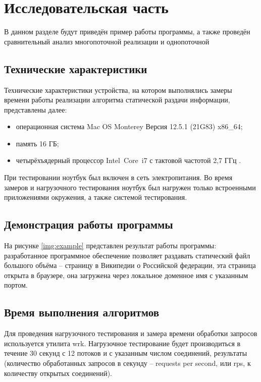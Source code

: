 \chapter{Исследовательская часть}

В данном разделе будут приведён пример работы программы, а также проведён сравнительный анализ многопоточной реализации и однопоточной

\section{Технические характеристики}

Технические характеристики устройства, на котором выполнялись замеры времени работы реализации алгоритма статической раздачи информации, представлены далее:

\begin{itemize}
	\item операционная система Mac OS Monterey Версия 12.5.1 (21G83) \cite{macos} x86\_64;
	\item память 16 ГБ;
	\item четырёхъядерный процессор Intel Core i7 с тактовой частотой 2,7 ГГц \cite{intel}.
\end{itemize}

При тестировании ноутбук был включен в сеть электропитания. Во время замеров и нагрузочного тестирования ноутбук был нагружен только встроенными приложениями окружения, а также системой тестирования.

\section{Демонстрация работы программы}

На рисунке \ref{img:example} представлен результат работы программы: разработанное программное обеспечение позволяет раздавать статический файл большого объёма -- страницу в Википедии о Российской федерации, эта страница открыта в браузере, она загружена через локальное доменное имя с указанным портом.

\clearpage

\section{Время выполнения алгоритмов}

Для проведения нагрузочного тестирования и замера времени обработки запросов используется утилита wrk.
Нагрузочное тестирование будет производиться в течение 30 секунд с 12 потоков и с указанным числом соединений, результаты (количество обработанных запросов в секунду -- requests per second, или rps, к количеству открытых соединений).


